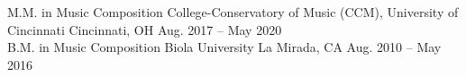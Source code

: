 
\begin{cventries}

  \cventry
  {M.M. in Music Composition} %
  {College-Conservatory of Music (CCM), University of Cincinnati} %
  {Cincinnati, OH} %
  {Aug. 2017 -- May 2020} %
  {
  } \\

  \cventry
  {B.M. in Music Composition} %
  {Biola University} %
  {La Mirada, CA} %
  {Aug. 2010 -- May 2016} %
  {
  } \\


\end{cventries}
